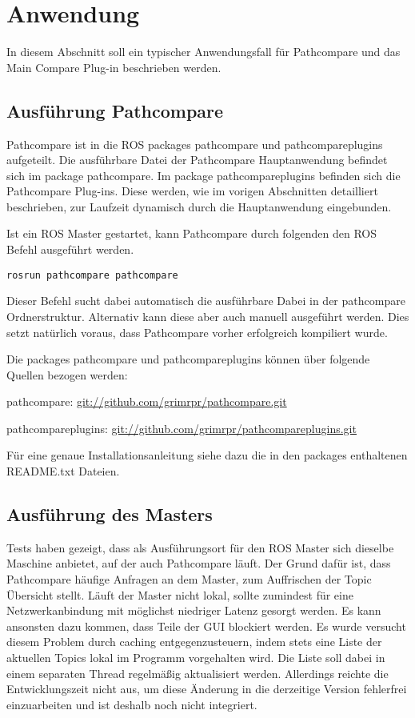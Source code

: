 \chapter{Anwendung}
\label{sec:andwendung}
In diesem Abschnitt soll ein typischer Anwendungsfall für Pathcompare und das
Main Compare Plug-in beschrieben werden. 

\section{Ausführung Pathcompare}

Pathcompare ist in die ROS packages pathcompare und pathcompareplugins
aufgeteilt. Die ausführbare Datei der Pathcompare Hauptanwendung befindet sich
im package pathcompare. Im package pathcompareplugins befinden sich die
Pathcompare Plug-ins. Diese werden, wie im vorigen Abschnitten detailliert
beschrieben, zur Laufzeit dynamisch durch die Hauptanwendung eingebunden.

Ist ein ROS Master gestartet, kann Pathcompare durch folgenden den ROS Befehl
ausgeführt werden.

\begin{lstlisting}[caption=Starten von Pathcompare, label=lst:rosrun]
rosrun pathcompare pathcompare
\end{lstlisting}

Dieser Befehl sucht dabei automatisch die ausführbare Dabei in der pathcompare
Ordnerstruktur. Alternativ kann diese aber auch manuell ausgeführt werden.
Dies setzt natürlich voraus, dass Pathcompare vorher erfolgreich kompiliert
wurde. 

Die packages pathcompare und pathcompareplugins können über folgende Quellen bezogen
werden:

pathcompare:
\url{git://github.com/grimrpr/pathcompare.git}

pathcompareplugins:
\url{git://github.com/grimrpr/pathcompareplugins.git}


Für eine genaue Installationsanleitung siehe dazu 
die in den packages enthaltenen README.txt Dateien.



\section{Ausführung des Masters}

Tests haben gezeigt, dass als Ausführungsort für den ROS Master sich dieselbe
Maschine anbietet, auf der auch Pathcompare läuft. Der Grund dafür ist, dass
Pathcompare häufige Anfragen an dem Master, zum Auffrischen der Topic
Übersicht stellt. Läuft der Master nicht lokal, sollte zumindest für eine
Netzwerkanbindung mit möglichst niedriger Latenz gesorgt werden. Es kann
ansonsten dazu kommen, dass Teile der GUI blockiert werden. Es wurde versucht
diesem Problem durch caching entgegenzusteuern, indem stets eine Liste der
aktuellen Topics lokal im Programm vorgehalten wird. Die Liste soll dabei in einem
separaten Thread regelmäßig aktualisiert werden. Allerdings reichte die
Entwicklungszeit nicht aus, um diese Änderung in die derzeitige Version
fehlerfrei einzuarbeiten und ist deshalb noch nicht integriert. 


